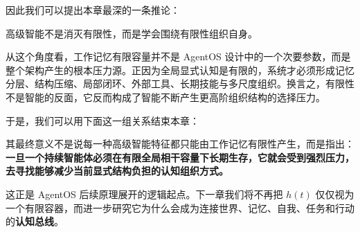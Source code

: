 因此我们可以提出本章最深的一条推论：
\begin{statementbox}
高级智能不是消灭有限性，而是学会围绕有限性组织自身。
\end{statementbox}

从这个角度看，工作记忆有限容量并不是 AgentOS 设计中的一个次要参数，而是整个架构产生的根本压力源。正因为全局显式认知是有限的，系统才必须形成记忆分层、结构压缩、局部闭环、外部工具、长期技能与多尺度组织。换言之，有限性不是智能的反面，它反而构成了智能不断产生更高阶组织结构的选择压力。

于是，我们可以用下面这一组关系结束本章：
\begin{statementbox}
\centering
{}
\end{statementbox}
其最终意义不是说每一种高级智能特征都只能由工作记忆有限性产生，而是指出：\textbf{一旦一个持续智能体必须在有限全局相干容量下长期生存，它就会受到强烈压力，去寻找能够减少当前显式结构负担的认知组织方式。}

这正是 AgentOS 后续原理展开的逻辑起点。下一章我们将不再把 $h(t)$ 仅仅视为一个有限容器，而进一步研究它为什么会成为连接世界、记忆、自我、任务和行动的\textbf{认知总线}。
